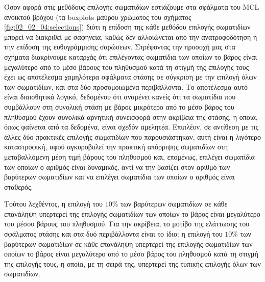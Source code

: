 Όσον αφορά στις μεθόδους επιλογής σωματιδίων εστιάζουμε στα σφάλματα του MCL
ανοικτού βρόχου (τα boxplots μαύρου χρώματος του σχήματος
\ref{fig:02_02_04:selections}) διότι η επίδοση της κάθε μεθόδου επιλογής
σωματιδίων μπορεί να διακριθεί με σαφήνεια, καθώς δεν αλλοιώνεται από την
ανατροφοδότηση ή την επίδοση της ευθυγράμμισης σαρώσεων. Στρέφοντας την προσοχή
μας στα σχήματα διακρίνουμε καταρχάς ότι επιλέγοντας σωματίδια των οποίων το
βάρος είναι μεγαλύτερο από το μέσο βάρους του πληθυσμού κατά τη στιγμή της
επιλογής τους έχει ως αποτέλεσμα χαμηλότερα σφάλματα στάσης σε σύγκριση με την
επιλογή όλων των σωματιδίων, και στα δύο προσομοιωμένα περιβάλλοντα. Το
αποτέλεσμα αυτό είναι διαισθητικά λογικό, δεδομένου ότι αναμένει κανείς ότι τα
σωματίδια που συμβάλλουν στη συνολική στάση με βάρος μικρότερο από το μέσο
βάρος του πληθυσμού έχουν συνολικά αρνητική συνεισφορά στην ακρίβεια της
στάσης, η οποία, όπως φαίνεται από τα δεδομένα, είναι σχεδόν αμελητέα.
Επιπλέον, σε αντίθεση με τις άλλες δύο πρακτικές επιλογής σωματιδίων που
παρουσιάστηκαν, αυτή είναι η λιγότερο καταστροφική, αφού αγκυροβολεί την
πρακτική απόρριψης σωματιδίων στη μεταβαλλόμενη μέση τιμή βάρους του πληθυσμού
και, επομένως, επιλέγει σωματίδια των οποίων ο αριθμός είναι δυναμικός, αντί να
την βασίζει στον αριθμό των βαρύτερων σωματιδίων και να επιλέγει σωματίδια των
οποίων ο αριθμός είναι σταθερός.

Τούτου λεχθέντος, η επιλογή του $10\%$ των βαρύτερων σωματιδίων σε κάθε
επανάληψη υπερτερεί της επιλογής σωματιδίων των οποίων το βάρος είναι
μεγαλύτερο του μέσου βάρους του πληθυσμού. Για την ακρίβεια, το μοτίβο της
ελάττωσης του σφάλματος στάσης και στα δυό περιβάλλοντα είναι το ίδιο: η
επιλογή του $10\%$ των βαρύτερων σωματιδίων σε κάθε επανάληψη υπερτερεί της
επιλογής σωματιδίων των οποίων το βάρος είναι μεγαλύτερο από το μέσο βάρος του
πληθυσμού κατά τη στιγμή της επιλογής τους, η οποία, με τη σειρά της, υπερτερεί
της τυπικής επιλογής όλων των σωματιδίων.

